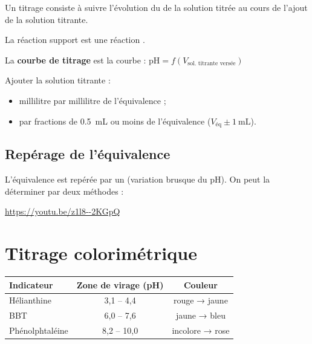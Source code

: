 Un titrage  consiste à suivre l'évolution du  de la solution titrée au cours de l'ajout de la solution titrante.

La réaction support est une réaction .

La \textbf{courbe de titrage} est la courbe : $\text{pH} = f(V_{\text{sol. titrante versée}})$

 Ajouter la solution titrante :
\begin{itemize}
    \item millilitre par millilitre  de l'équivalence ;
    \item par fractions de \SI{0.5}{\milli\liter} ou moins  de l'équivalence ($V_{\text{éq}} \pm \SI{1}{\milli\liter}$).
\end{itemize}

\subsection{Repérage de l'équivalence}

L'équivalence est repérée par un  (variation brusque du pH). On peut la déterminer par deux méthodes :



\url{https://youtu.be/z1l8--2KGpQ}

\section{Titrage colorimétrique}


\begin{center}
\begin{tabular}{|l|c|c|}
\hline
\textbf{Indicateur} & \textbf{Zone de virage (pH)} & \textbf{Couleur} \\
\hline
Hélianthine & 3,1 – 4,4 & rouge → jaune \\
BBT & 6,0 – 7,6 & jaune → bleu \\
Phénolphtaléine & 8,2 – 10,0 & incolore → rose \\
\hline
\end{tabular}
\end{center}

